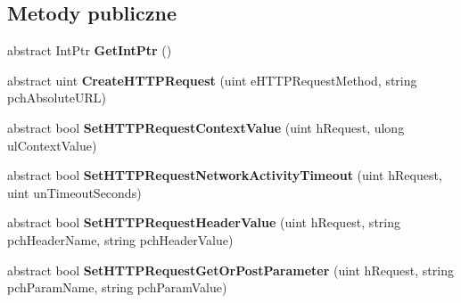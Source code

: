 \subsection*{Metody publiczne}
\begin{DoxyCompactItemize}
\item 
\mbox{\label{class_valve_1_1_steamworks_1_1_i_steam_h_t_t_p_a4860af724b6982ddc4e2a6bbacb333e5}} 
abstract Int\+Ptr {\bfseries Get\+Int\+Ptr} ()
\item 
\mbox{\label{class_valve_1_1_steamworks_1_1_i_steam_h_t_t_p_a2e886d1dc6b51b8dcf7824d30dd5d526}} 
abstract uint {\bfseries Create\+H\+T\+T\+P\+Request} (uint e\+H\+T\+T\+P\+Request\+Method, string pch\+Absolute\+U\+RL)
\item 
\mbox{\label{class_valve_1_1_steamworks_1_1_i_steam_h_t_t_p_a99579808fe80cd66dad111dafc9db130}} 
abstract bool {\bfseries Set\+H\+T\+T\+P\+Request\+Context\+Value} (uint h\+Request, ulong ul\+Context\+Value)
\item 
\mbox{\label{class_valve_1_1_steamworks_1_1_i_steam_h_t_t_p_ad0a025bbb725a139e6ca38a690a92984}} 
abstract bool {\bfseries Set\+H\+T\+T\+P\+Request\+Network\+Activity\+Timeout} (uint h\+Request, uint un\+Timeout\+Seconds)
\item 
\mbox{\label{class_valve_1_1_steamworks_1_1_i_steam_h_t_t_p_aa39cf6a78678862ed3ffb8ca55293b6e}} 
abstract bool {\bfseries Set\+H\+T\+T\+P\+Request\+Header\+Value} (uint h\+Request, string pch\+Header\+Name, string pch\+Header\+Value)
\item 
\mbox{\label{class_valve_1_1_steamworks_1_1_i_steam_h_t_t_p_a34772dec6721b108e289be06be296ad8}} 
abstract bool {\bfseries Set\+H\+T\+T\+P\+Request\+Get\+Or\+Post\+Parameter} (uint h\+Request, string pch\+Param\+Name, string pch\+Param\+Value)
\item 
\mbox{\label{class_valve_1_1_steamworks_1_1_i_steam_h_t_t_p_aea9cbcd6efb34f5fd8aa1da317fa4356}} 

\end{DoxyCompactItemize}

